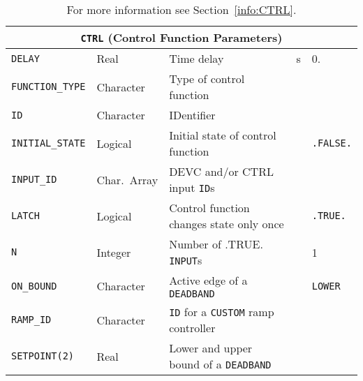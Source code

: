 \documentclass[11pt]{book}
\newcommand{\ct}{\tt\small}
\begin{document}
\hspace{1in}

\begin{table}[H]
\caption{For more information see Section~\ref{info:CTRL}.}\label{tbl:CTRL}
\noindent
\begin{tabular*}{6.5in}{@{\extracolsep\fill}|l|l|l|l|l|}
\hline
\multicolumn{5}{|c|}{{\ct CTRL} (Control Function Parameters)} \\ \hline \hline
{\ct DELAY}          & Real         & Time delay                                  & s  &  0.                       \\ \hline
{\ct FUNCTION\_TYPE} & Character    & Type of control function                    &    &                           \\ \hline
{\ct ID}             & Character    & IDentifier                                  &    &                           \\ \hline
{\ct INITIAL\_STATE} & Logical      & Initial state of control function           &    & {\ct .FALSE.}             \\ \hline
{\ct INPUT\_ID}      & Char.~Array  & DEVC and/or CTRL input {\ct ID}s            &    &                           \\ \hline
{\ct LATCH}          & Logical      & Control function changes state only once    &    & {\ct .TRUE.}              \\ \hline
{\ct N}              & Integer      & Number of .TRUE. {\ct INPUT}s               &    &   1                       \\ \hline
{\ct ON\_BOUND}      & Character    & Active edge of a {\ct DEADBAND}             &    & {\ct LOWER}               \\ \hline
{\ct RAMP\_ID}       & Character    & {\ct ID} for a {\ct CUSTOM} ramp controller &    &                           \\ \hline
{\ct SETPOINT(2)}    & Real         & Lower and upper bound of a {\ct DEADBAND}   &    &                           \\ \hline
\end{tabular*}
\end{table}
\end{document}
